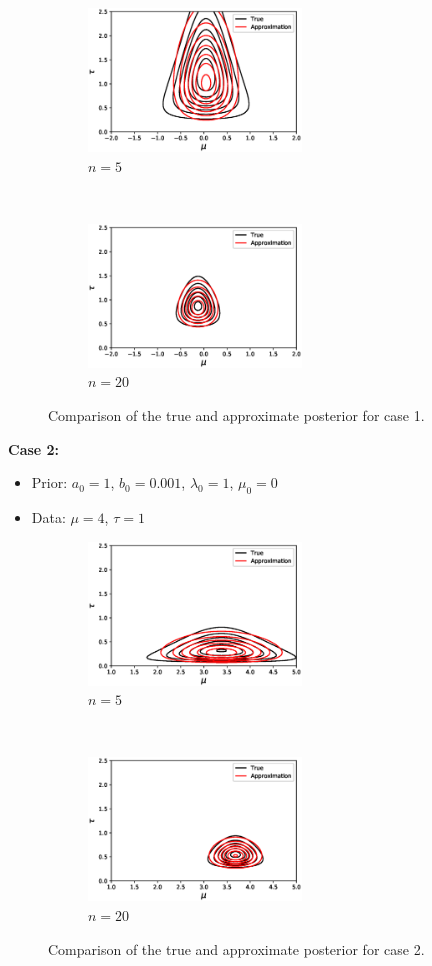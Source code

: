 \documentclass[a4paper]{article}
\begin{document}
\begin{figure}[h!]
	\centering
	\begin{subfigure}[t]{0.5\textwidth}
		\centering
		\includegraphics[height=1.5in]{Case1a.eps}
		\caption{$n=5$}
	\end{subfigure}%
	~ 
	\begin{subfigure}[t]{0.5\textwidth}
		\centering
		\includegraphics[height=1.5in]{Case1b.eps}
		\caption{$n=20$}
	\end{subfigure}
	\caption{Comparison of the true and approximate posterior for case 1.}
\end{figure}
\newpage
\textbf{Case 2:} 
\begin{itemize}
	\item Prior: $a_0=1$, $b_0= 0.001$, $\lambda_0=1$, $\mu_0 = 0$
	\item Data: $\mu=4$, $\tau=1$
\end{itemize}

\begin{figure}[h!]
	\centering
	\begin{subfigure}[t]{0.5\textwidth}
		\centering
		\includegraphics[height=1.5in]{Case2a.eps}
		\caption{$n=5$}
	\end{subfigure}%
	~ 
	\begin{subfigure}[t]{0.5\textwidth}
		\centering
		\includegraphics[height=1.5in]{Case2b.eps}
		\caption{$n=20$}
	\end{subfigure}
	\caption{Comparison of the true and approximate posterior for case 2.}
\end{figure}
\end{document}
